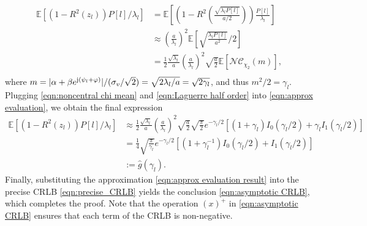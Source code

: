 \documentclass[12pt,draftclsnofoot,journal,onecolumn]{IEEEtran}
\theoremstyle{nonumberplain}
\def \nc {\mathcal{NC}}
\begin{document}
    \begin{equation}
        \begin{aligned}
        \mathbb{E}[(1-R^2(z_l))P[l]/\lambda_l] & = \mathbb{E}\left[\left(1-R^2\left(\frac{\sqrt{\lambda_l P[l]}}{a/2}\right)\right)\frac{P[l]}{\lambda_l}\right] \\
        & \approx \left(\frac{a}{\lambda_l}\right)^2 \mathbb{E}\left[ \sqrt{\frac{\lambda_l P[l]}{a^2}}/2 \right]\\
        & = \frac{1}{2}\frac{\sqrt{\lambda_l}}{a}\left(\frac{a}{\lambda_l}\right)^2 \sqrt{\frac{a}{2}}\mathbb{E}\left[\nc_{\chi_2}(m)\right],\\
        \end{aligned}
        \label{eqn:approx evaluation}
    \end{equation}
    where $m=\lvert\alpha + \beta e^{{\rm j} (\psi_l + \varphi)}\rvert/(\sigma_v / \sqrt{2}) = \sqrt{2\lambda_l/a} = \sqrt{2\gamma_l}$, and thus $m^2/2=\gamma_l$. Plugging \eqref{eqn:noncentral chi mean} and \eqref{eqn:Laguerre half order} into \eqref{eqn:approx evaluation}, we obtain the final expression 
    \begin{equation}
        \begin{aligned}
        \mathbb{E}[(1-R^2(z_l))P[l]/\lambda_l] & \approx \frac{1}{2}\frac{\sqrt{\lambda_l}}{a}\left(\frac{a}{\lambda_l}\right)^2 \sqrt{\frac{a}{2}} \sqrt{\frac{\pi}{2}} e^{-\gamma_l/2}\left[(1+\gamma_l)I_0(\gamma_l/2)+\gamma_l I_1(\gamma_l/2)\right] \\
        & = \frac{1}{4}\sqrt{\frac{\pi}{\gamma_l}}e^{-\gamma_l/2}\left[(1+\gamma_l^{-1})I_0(\gamma_l/2)+ I_1(\gamma_l/2)\right] \\
        & := \hat{g}(\gamma_l).
        \end{aligned}
        \label{eqn:approx evaluation result}
    \end{equation}
    Finally, substituting the approximation \eqref{eqn:approx evaluation result} into the precise CRLB \eqref{eqn:precise_CRLB} yields the conclusion \eqref{eqn:asymptotic CRLB}, which completes the proof. Note that the operation $(x)^+$ in \eqref{eqn:asymptotic CRLB} ensures that each term of the CRLB is non-negative. 
\end{document}
